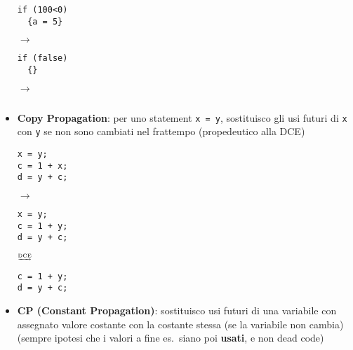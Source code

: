 \begin{itemize}
      \begin{minipage}[c]{.25\textwidth}
        \begin{lstlisting}
if (100<0)
  {a = 5}\end{lstlisting}
      \end{minipage}
      \hfill $\rightarrow$ \hfill
      \begin{minipage}[c]{.25\textwidth}
        \begin{lstlisting}
if (false)
  {}\end{lstlisting}
      \end{minipage}
      \hfill $\rightarrow$ \hfill
      \begin{minipage}[c]{.25\textwidth}
        \begin{lstlisting}

        \end{lstlisting}
      \end{minipage}
    \item \textbf{Copy Propagation}: per uno statement \lstinline|x = y|, sostituisco gli usi futuri di \lstinline|x| con \lstinline|y| se non sono cambiati nel frattempo (propedeutico alla DCE)\vspace{.5em}\\
      \begin{minipage}[c]{.25\textwidth}
        \begin{lstlisting}
x = y;
c = 1 + x;
d = y + c;\end{lstlisting}
      \end{minipage}
      \hfill $\rightarrow$ \hfill
      \begin{minipage}[c]{.25\textwidth}
        \begin{lstlisting}
x = y;
c = 1 + y;
d = y + c;\end{lstlisting}
      \end{minipage}
      \hfill $\tiny\underrightarrow{\text{DCE}}$ \hfill
      \begin{minipage}[c]{.25\textwidth}
        \begin{lstlisting}
c = 1 + y;
d = y + c;\end{lstlisting}
      \end{minipage}
    \item \textbf{CP (Constant Propagation)}: sostituisco usi futuri di una variabile con assegnato valore costante con la costante stessa (se la variabile non cambia) (sempre ipotesi che i valori a fine es.~siano poi \textbf{usati}, e non dead code)\vspace{.5em}\\

\end{itemize}
